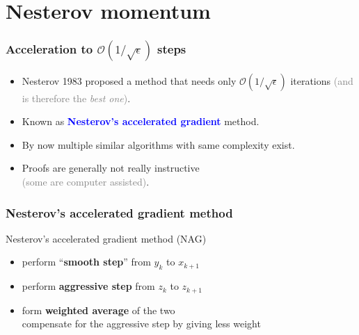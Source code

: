 \documentclass[aspectratio=149]{beamer}
\begin{document}
\section{Nesterov momentum}%
\label{sec:}

\begin{frame}
  \frametitle{Acceleration to $\mathcal{O}(1/\sqrt{\epsilon})$ steps}

  \begin{itemize}
    \item Nesterov 1983 proposed a method that needs only $\mathcal{O}(1/\sqrt{\epsilon})$ iterations \textcolor{gray}{(and is therefore the \textit{best one})}.
    \item Known as \textcolor{blue}{\textbf{Nesterov's accelerated gradient}} method.
    \item By now multiple similar algorithms with same complexity exist.
    \item Proofs are generally not really instructive \\
          \textcolor{gray}{(some are computer assisted)}.
  \end{itemize}

\end{frame}


\begin{frame}
  \frametitle{Nesterov's accelerated gradient method}
  \begin{algorithm}[H]
    \caption{Nesterov's accelerated gradient method (NAG)}
    \begin{algorithmic}[1]
      \EndFor{}
    \end{algorithmic}
  \end{algorithm}


  \begin{itemize}
    \item perform ``\textbf{smooth step}'' from $y_k$ to $x_{k+1}$
    \item perform \textbf{aggressive step} from $z_k$ to $z_{k+1}$
    \item form \textbf{weighted average} of the two\\
          compensate for the aggressive step by giving less weight
  \end{itemize}

\end{frame}
\end{document}
